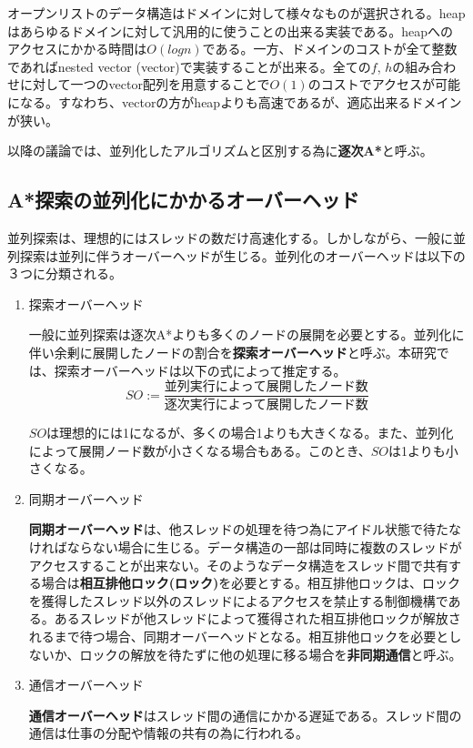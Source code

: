 \documentclass[uplatex]{jsarticle}
\begin{document}
オープンリストのデータ構造はドメインに対して様々なものが選択される。heapはあらゆるドメインに対して汎用的に使うことの出来る実装である。heapへのアクセスにかかる時間は$O(logn)$である。一方、ドメインのコストが全て整数であればnested vector (vector)で実装することが出来る。全ての$f$, $h$の組み合わせに対して一つのvector配列を用意することで$O(1)$のコストでアクセスが可能になる。すなわち、vectorの方がheapよりも高速であるが、適応出来るドメインが狭い。


以降の議論では、並列化したアルゴリズムと区別する為に\textbf{逐次A*}と呼ぶ。


\subsection{A*探索の並列化にかかるオーバーヘッド}

並列探索は、理想的にはスレッドの数だけ高速化する。しかしながら、一般に並列探索は並列に伴うオーバーヘッドが生じる。並列化のオーバーヘッドは以下の３つに分類される。

\begin{enumerate}
\item 探索オーバーヘッド
\newline

一般に並列探索は逐次A*よりも多くのノードの展開を必要とする。並列化に伴い余剰に展開したノードの割合を\textbf{探索オーバーヘッド}と呼ぶ。本研究では、探索オーバーヘッドは以下の式によって推定する。
\newline
\begin{equation}
	SO := \frac{並列実行によって展開したノード数}{逐次実行によって展開したノード数}
\end{equation}


$SO$は理想的には1になるが、多くの場合1よりも大きくなる。また、並列化によって展開ノード数が小さくなる場合もある。このとき、$SO$は1よりも小さくなる。
\newline

\item 同期オーバーヘッド
\newline

\textbf{同期オーバーヘッド}は、他スレッドの処理を待つ為にアイドル状態で待たなければならない場合に生じる。データ構造の一部は同時に複数のスレッドがアクセスすることが出来ない。そのようなデータ構造をスレッド間で共有する場合は\textbf{相互排他ロック(ロック)}を必要とする。相互排他ロックは、ロックを獲得したスレッド以外のスレッドによるアクセスを禁止する制御機構である。あるスレッドが他スレッドによって獲得された相互排他ロックが解放されるまで待つ場合、同期オーバーヘッドとなる。相互排他ロックを必要としないか、ロックの解放を待たずに他の処理に移る場合を\textbf{非同期通信}と呼ぶ。
\newline

\item 通信オーバーヘッド
\newline

\textbf{通信オーバーヘッド}はスレッド間の通信にかかる遅延である。スレッド間の通信は仕事の分配や情報の共有の為に行われる。

\end{enumerate}
\end{document}

